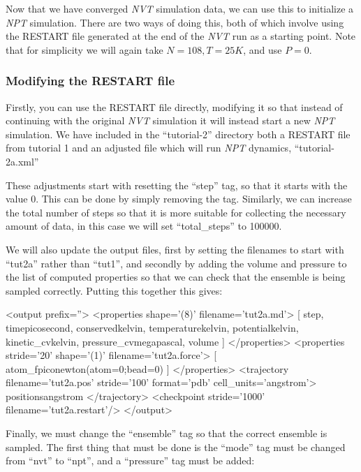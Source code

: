 \documentclass[11pt,english,fleqn]{report}
\newenvironment{code}{%
\footnotesize 
\verbatim
}{
\endverbatim
\normalsize
}
\begin{document}
\label{part2}

Now that we have converged \emph{NVT} simulation data, we can use this to
initialize a \emph{NPT} simulation. 
There are two ways of doing this,
both of which involve using the RESTART file generated at
the end of the \emph{NVT} run as a starting point.
Note that for simplicity we will again take \(N=108, T=25 K\), and use
\(P=0\).

\subsubsection{Modifying the RESTART file}

Firstly, you can use the RESTART file directly, modifying it
so that instead of continuing with the original \emph{NVT} simulation
it will instead start a new \emph{NPT} simulation. We have included
in the {}``tutorial-2'' directory both a RESTART file from
tutorial 1 and an adjusted file which will run \emph{NPT} dynamics,
{}``tutorial-2a.xml''

These adjustments start with resetting the {}``step'' tag, so that
it starts with the value 0. This can be done by simply removing the
tag. Similarly, we can increase the total number of
steps so that it is more suitable for collecting the necessary
amount of data, in this case we will set
{}``total\_steps'' to 100000.

We will also update the output files, first by setting the filenames
to start with {}``tut2a'' rather than {}``tut1'', and secondly by adding
the volume and pressure to the list of computed properties so that
we can check that the ensemble is being sampled correctly.
Putting this together this gives:

\begin{code}
<output prefix=''>
   <properties shape='(8)' filename='tut2a.md'>
      [ step, time{picosecond}, conserved{kelvin}, 
        temperature{kelvin}, potential{kelvin}, kinetic_cv{kelvin}, 
        pressure_cv{megapascal}, volume ] 
   </properties>
   <properties stride='20' shape='(1)' filename='tut2a.force'> 
      [ atom_f{piconewton}(atom=0;bead=0) ] 
   </properties>
   <trajectory filename='tut2a.pos' stride='100' format='pdb' cell_units='angstrom'>
      positions{angstrom}
   </trajectory>
   <checkpoint stride='1000' filename='tut2a.restart'/>
</output>
\end{code}

Finally, we must change the {}``ensemble'' tag so that the correct
ensemble is sampled. The first thing that must be done is  
the {}``mode'' tag must be changed from {}``nvt'' to {}``npt'',
and a {}``pressure'' tag must be added:
\end{document}
